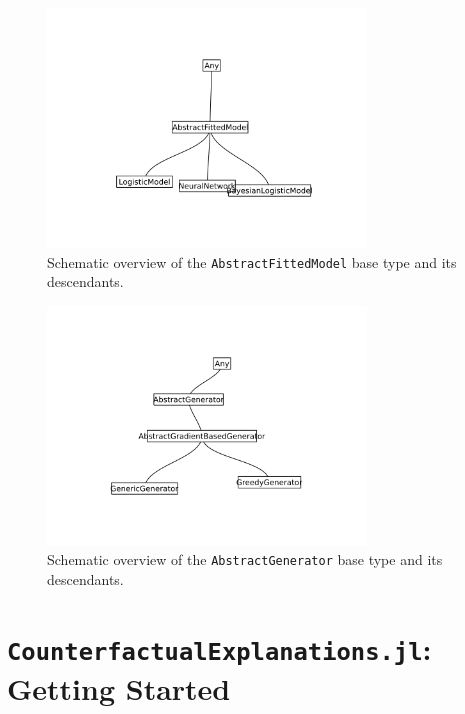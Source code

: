 \documentclass{juliacon}
\begin{document}
\begin{figure}

{\centering \includegraphics[width=3.33333in,height=2.5in]{www/models.png}

}

\caption{\label{fig-models}Schematic overview of the
\texttt{AbstractFittedModel} base type and its descendants.}

\end{figure}

\begin{figure}

{\centering \includegraphics[width=3.33333in,height=2.5in]{www/generators.png}

}

\caption{\label{fig-generators}Schematic overview of the
\texttt{AbstractGenerator} base type and its descendants.}

\end{figure}

\hypertarget{sec-start}{%
\section{\texorpdfstring{\texttt{CounterfactualExplanations.jl}: Getting
Started}{CounterfactualExplanations.jl: Getting Started}}\label{sec-start}}
\end{document}
